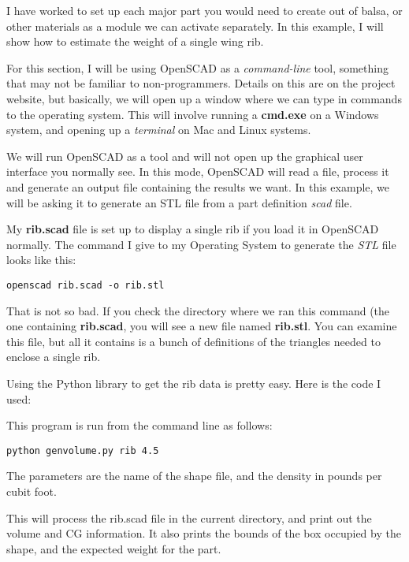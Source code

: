 I have worked to set up each major part you would need to create out of balsa,
or other materials as a module we can activate separately. In this example, I
will show how to estimate the weight of a single wing rib.

For this section, I will be using OpenSCAD as a {\it command-line} tool,
something that may not be familiar to non-programmers. Details on this are on
the project website, but basically, we will open up a window where we can type
in commands to the operating system. This will involve running a {\bf cmd.exe}
on a Windows system, and opening up a {\it terminal} on Mac and Linux systems.

We will run OpenSCAD as a tool and will not open up the graphical user
interface you normally see. In this mode, OpenSCAD will read a file, process it
and generate an output file containing the results we want. In this example, we
will be asking it to generate an STL file from a part definition {\it scad}
file.

My {\bf rib.scad} file is set up to display a single rib if you load it in
OpenSCAD normally. The command I give to my Operating System to generate the
{\it STL} file looks like this:

\begin{lstlisting}
openscad rib.scad -o rib.stl
\end{lstlisting}

That is not so bad. If you check the directory where we ran this command (the
one containing {\bf rib.scad}, you will see a new file named {\bf rib.stl}. You
can examine this file, but all it contains is a bunch of definitions of the
triangles needed to enclose a single rib.

Using the Python library to get the rib data is pretty easy. Here is the code
I used:


This program is run from the command line as follows:

\begin{lstlisting}
python genvolume.py rib 4.5
\end{lstlisting}

The parameters are the name of the shape file, and the density in pounds per cubit foot.

This will process the rib.scad file in the current directory, and print out the
volume and CG information. It also prints the bounds of the box occupied by the
shape, and the expected weight for the part.

